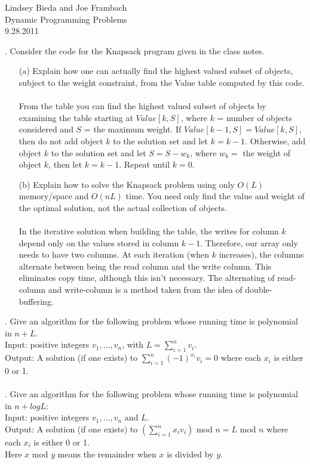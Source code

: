 \documentclass[10pt]{article}
\begin{document}
	\begin{flushright}
	Lindsey Bieda and Joe Frambach\\
	Dynamic Programming Problems\\
	9.28.2011
	\end{flushright}
	. 	Consider the code for the Knapsack program given in the class notes.
	\begin{enumerate}
	\item[(a)]	Explain how one can actually find the highest valued subset of objects, subject to the weight
							constraint, from the Value table computed by this code.\\
							\\
							From the table you can find the highest valued subset of objects by examining the table starting
							at $Value[k,S]$, where $k$ = number of objects considered and $S$ = the maximum weight. If
							$Value[k-1,S] = Value[k,S]$, then do not add object $k$ to the solution set and let $k = k - 1$. 
							Otherwise, add object $k$ to the solution set and let $S=S-w_k$, where $w_k = $
							the weight of object $k$, then let $k=k-1$. Repeat until $k=0$.
	\item[(b)]	Explain how to solve the Knapsack problem using only $O(L)$ memory/space and $O(nL)$ time. You
							need only find the value and weight of the optimal solution, not the actual collection of objects.\\
							\\
							In the iterative solution when building the table, the writes for column $k$ depend only on the values
							stored in column $k-1$. Therefore, our array only needs to have two columns. At each iteration (when $k$ increases),
							the columns alternate between being the read column and the write column. This eliminates copy time, although
							this isn't necessary. The alternating of read-column and write-column is a method taken from the idea of
							double-buffering.
	\end{enumerate}
	
	.	Give an algorithm for the following problem whose running time is polynomial in $n + L$.\\
			Input: positive integers $v_1, \ldots, v_n$, with $L = \sum_{i=1}^n v_i$.\\
			Output: A solution (if one exists) to $\sum_{i=1}^n (-1)^{x_i} v_i = 0$ where each $x_i$ is either 0 or 1.\\
			\\
	.	Give an algorithm for the following problem whose running time is polynomial in $n + log L$:\\
			Input: positive integers $v_1, \ldots , v_n$ and $L$.\\
			Output:  A solution (if one exists) to $(\sum_{i=1}^n x_i v_i)$ mod $n = L$ mod $n$ where each $x_i$ is either 0 or 1.\\
			Here $x$ mod $y$ means the remainder when $x$ is divided by $y$.
\end{document}

